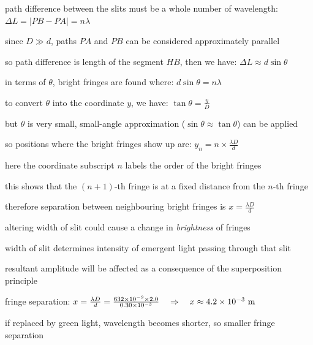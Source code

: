 path difference between the slits must be a whole number of wavelength: $ \Delta L = \big|PB-PA\big| = n\lambda $

since $D \gg d$, paths $PA$ and $PB$ can be considered approximately parallel

so path difference is length of the segment $HB$, then we have: $\Delta L \approx d\sin\theta$

in terms of $\theta$, bright fringes are found where: $ d\sin\theta = n\lambda $

to convert $\theta$ into the coordinate $y$, we have: $\tan \theta = \frac{y}{D}$

but $\theta$ is very small, small-angle approximation ($\sin \theta \approx \tan \theta$) can be applied

so positions where the bright fringes show up are: $ y_n =  n \times \frac{\lambda D}{d} $

here the coordinate subscript $n$ labels the order of the bright fringes

this shows that the $(n+1)$-th fringe is at a fixed distance from the $n$-th fringe

therefore separation between neighbouring bright fringes is $ {x=\frac{\lambda D}{d}} $ \eoe

\cmt altering width of slit could cause a change in \emph{brightness} of fringes

width of slit determines intensity of emergent light passing through that slit

resultant amplitude will be affected as a consequence of the superposition principle


\begin{soln} fringe separation: $ x = \frac{\lambda D}{d} = \frac{632 \times 10^{-9} \times 2.0 }{0.30 \times 10^{-3}} \quad \Rightarrow \quad x \approx 4.2 \times 10^{-3} \text{ m}$

if replaced by green light, wavelength becomes shorter, so smaller fringe separation \end{soln}




